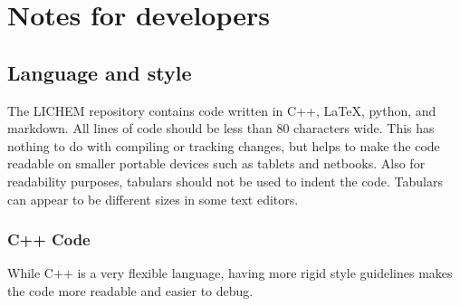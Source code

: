 \documentclass[12pt]{report}
\begin{document}
\section{Notes for developers}

\subsection{Language and style}

The LICHEM repository contains code written in C++, \LaTeX, python,
and markdown.
All lines of code should be less than 80 characters wide.
This has nothing to do with compiling or tracking changes, but helps to make
the code readable on smaller portable devices such as tablets and netbooks.
Also for readability purposes, tabulars should not be used to indent the code.
Tabulars can appear to be different sizes in some text editors. \\

\subsubsection{C++ Code}

While C++ is a very flexible language, having more rigid style guidelines makes
the code more readable and easier to debug. \\
\end{document}
